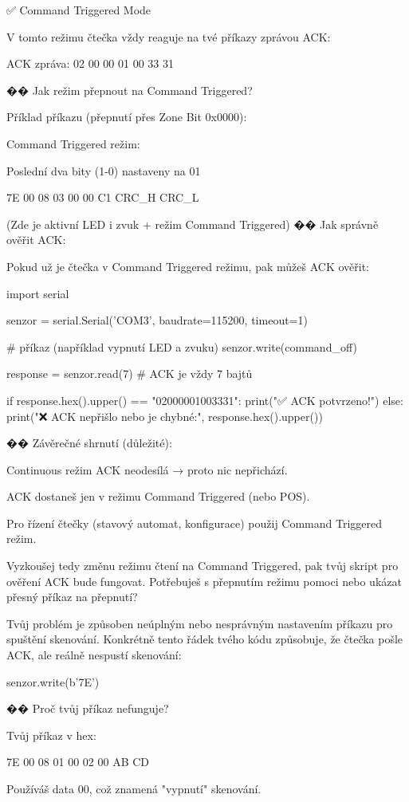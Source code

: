     ✅ Command Triggered Mode

V tomto režimu čtečka vždy reaguje na tvé příkazy zprávou ACK:

ACK zpráva: 02 00 00 01 00 33 31

�� Jak režim přepnout na Command Triggered?

Příklad příkazu (přepnutí přes Zone Bit 0x0000):

Command Triggered režim:

    Poslední dva bity (1-0) nastaveny na 01

7E 00 08 03 00 00 C1 CRC_H CRC_L

(Zde je aktivní LED i zvuk + režim Command Triggered)
�� Jak správně ověřit ACK:

Pokud už je čtečka v Command Triggered režimu, pak můžeš ACK ověřit:

import serial

senzor = serial.Serial('COM3', baudrate=115200, timeout=1)

# příkaz (například vypnutí LED a zvuku)
senzor.write(command_off)

response = senzor.read(7)  # ACK je vždy 7 bajtů

if response.hex().upper() == "02000001003331":
    print("✅ ACK potvrzeno!")
else:
    print("❌ ACK nepřišlo nebo je chybné:", response.hex().upper())

�� Závěrečné shrnutí (důležité):

    Continuous režim ACK neodesílá → proto nic nepřichází.

    ACK dostaneš jen v režimu Command Triggered (nebo POS).

    Pro řízení čtečky (stavový automat, konfigurace) použij Command Triggered režim.

Vyzkoušej tedy změnu režimu čtení na Command Triggered, pak tvůj skript pro ověření ACK bude fungovat. Potřebuješ s přepnutím režimu pomoci nebo ukázat přesný příkaz na přepnutí?

Tvůj problém je způsoben neúplným nebo nesprávným nastavením příkazu pro spuštění skenování. Konkrétně tento řádek tvého kódu způsobuje, že čtečka pošle ACK, ale reálně nespustí skenování:

senzor.write(b'\x7E\xAB\xCD')

�� Proč tvůj příkaz nefunguje?

Tvůj příkaz v hex:

7E 00 08 01 00 02 00 AB CD

    Používáš data 00, což znamená "vypnutí" skenování.

